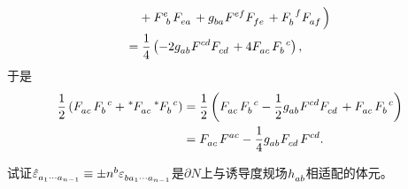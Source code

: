 \begin{xiti}
\begin{zm}
\begin{align*}
		& + \tensor{F}{^e_b} \tensor{F}{_e_a} + \tensor{g}{_b_a} \tensor{F}{^e^f} \tensor{F}{_f_e} + \tensor{F}{_b^f} \tensor{F}{_a_f} \Big)\\
		=& \mspace{5mu} \frac{1}{4} \left( -2\tensor{g}{_a_b} \tensor{F}{^c^d} \tensor{F}{_c_d} + 4 \tensor{F}{_a_c} \tensor{F}{_b^c}  \right),
		\end{align*}
		于是
		\begin{align*}
		\frac{1}{2} \left( \tensor{F}{_a_c}\tensor{F}{_b^c} + \tensor[^*]{F}{_a_c} \tensor[^*]{F}{_b^c} \right)&= \frac{1}{2} \left( \tensor{F}{_a_c} \tensor{F}{_b^c} - \frac{1}{2} \tensor{g}{_a_b} \tensor{F}{^c^d} \tensor{F}{_c_d} + \tensor{F}{_a_c} \tensor{F}{_b^c} \right)\\
		&= \tensor{F}{_a_c} \tensor{F}{^a^c} - \frac{1}{4} \tensor{g}{_a_b} \tensor{F}{_c_d} \tensor{F}{^c^d}.
		\end{align*}
	\end{zm}

	\item 试证$\tensor{\hat{\varepsilon}}{_{a_1\cdots a_{n-1}}} \equiv \pm \tensor{n}{^b} \tensor{\varepsilon}{_{b a_1 \cdots a_{n-1}}} $是$\partial N $上与诱导度规场$\tensor{h}{_a_b} $相适配的体元。


\end{xiti}
